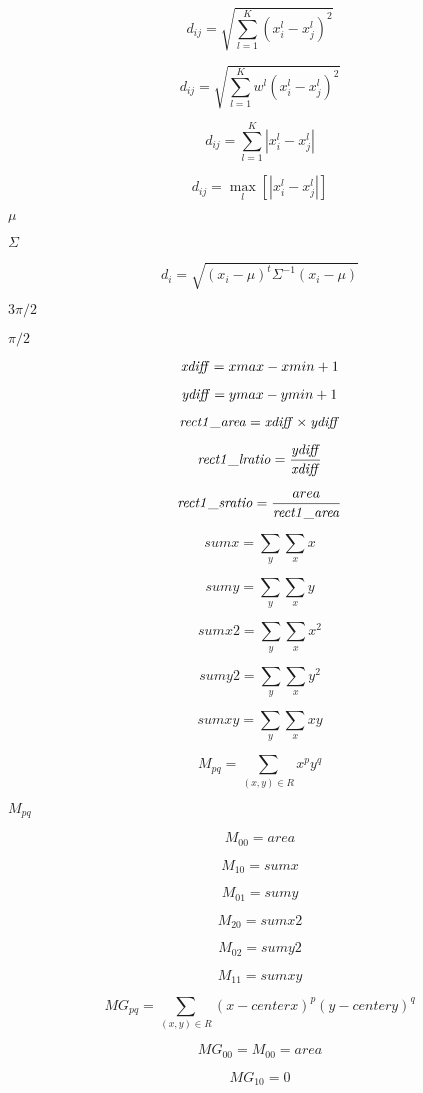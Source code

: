 \documentclass{article}
\begin{document}
\[ d_{ij} = \sqrt{ \sum _{l = 1}^{K} \left( x_{i}^{l} - x_{j}^{l} \right)^{2} } \]
\pagebreak

\[ d_{ij} = \sqrt{ \sum _{l = 1}^{K} w^{l} \left( x_{i}^{l} - x_{j}^{l} \right)^{2} } \]
\pagebreak

\[ d_{ij} = \sum _{l = 1}^{K} | x_{i}^{l} - x_{j}^{l} | \]
\pagebreak

\[ d_{ij} = \max _{l} \left[ | x_{i}^{l} - x_{j}^{l} | \right] \]
\pagebreak

$ \mu $
\pagebreak

$ \Sigma $
\pagebreak

\[ d_{i} = \sqrt{\left( x_{i} - \mu \right)^{t} \Sigma^{-1} \left( x_{i} - \mu \right) } \]
\pagebreak

$3\pi/2$
\pagebreak

$\pi/2$
\pagebreak

\[{\it xdiff} = xmax - xmin + 1\]
\pagebreak

\[{\it ydiff} = ymax - ymin + 1\]
\pagebreak

\[{\it rect1\_area} = {\it xdiff} \times {\it ydiff}\]
\pagebreak

\[{\it rect1\_lratio} = \frac{\it ydiff}{\it xdiff}\]
\pagebreak

\[{\it rect1\_sratio} = \frac{area}{\it rect1\_area}\]
\pagebreak

\[sumx = \sum_{y}\sum_{x}{x} \]
\pagebreak

\[sumy = \sum_{y}\sum_{x}{y} \]
\pagebreak

\[sumx2 = \sum_{y}\sum_{x}{x^2} \]
\pagebreak

\[sumy2 = \sum_{y}\sum_{x}{y^2} \]
\pagebreak

\[sumxy = \sum_{y}\sum_{x}{xy} \]
\pagebreak

\[M_{pq} = \sum_{(x,y) \in R}{x^p y^q} \]
\pagebreak

$M_{pq}$
\pagebreak

\[ M_{00} = area \]
\pagebreak

\[M_{10} = sumx \]
\pagebreak

\[M_{01} = sumy \]
\pagebreak

\[M_{20} = sumx2 \]
\pagebreak

\[M_{02} = sumy2 \]
\pagebreak

\[M_{11} = sumxy \]
\pagebreak

\[MG_{pq} = \sum_{(x,y) \in R}{(x-centerx)^p(y-centery)^q} \]
\pagebreak

\[ MG_{00} = M_{00} = area \]
\pagebreak

\[ MG_{10} = 0 \]
\pagebreak
\end{document}
